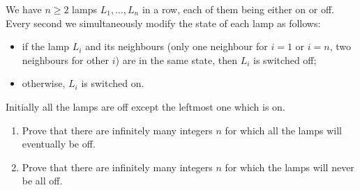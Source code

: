 We have $n \geq 2$ lamps $L_1, \ldots, L_n$ in a row, each of them being either on or off. Every second we simultaneously modify the state of each lamp as follows:

\begin{itemize}
\item if the lamp $L_i$ and its neighbours (only one neighbour for $i = 1$ or $i = n$, two neighbours for other $i$) are in the same state, then $L_i$ is switched off;
\item otherwise, $L_i$ is switched on.
\end{itemize}

Initially all the lamps are off except the leftmost one which is on.

\begin{enumerate}
\item[(a)] Prove that there are infinitely many integers $n$ for which all the lamps will eventually be off.
\item[(b)] Prove that there are infinitely many integers $n$ for which the lamps will never be all off.
\end{enumerate}
